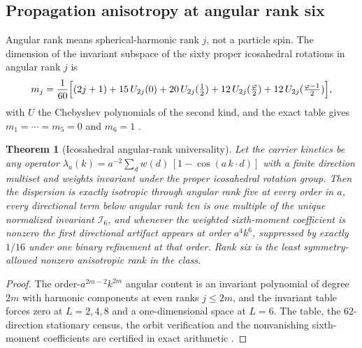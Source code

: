 \documentclass[11pt]{article}
\newtheorem{theorem}{Theorem}[section]
\theoremstyle{definition}
\theoremstyle{remark}
\begin{document}
\subsection{Propagation anisotropy at angular rank six}
\label{sec:spin-six}

Angular rank means spherical-harmonic rank $j$, not a particle spin. The dimension of the invariant subspace of the sixty proper icosahedral rotations in angular rank $j$ is
\[
m_j=\frac1{60}\Bigl[(2j+1)+15\,U_{2j}(0)+20\,U_{2j}(\tfrac12)
+12\,U_{2j}(\tfrac\varphi2)+12\,U_{2j}(\tfrac{\varphi-1}2)\Bigr],
\]
with $U$ the Chebyshev polynomials of the second kind, and the exact table
gives $m_1=\cdots=m_5=0$ and $m_6=1$ \cite{cohan1958}.

\begin{theorem}[Icosahedral angular-rank universality]
\label{thm:spin-six}
Let the carrier kinetics be any operator
$\lambda_a(k)=a^{-2}\sum_d w(d)\,[1-\cos(a\,k\!\cdot\!d)]$ with a finite
direction multiset and weights invariant under the proper icosahedral
rotation group. Then the dispersion is exactly isotropic through angular rank
five at every order in $a$, every directional term below angular rank ten is
one multiple of the unique normalized invariant $\mathcal I_6$, and whenever
the weighted sixth-moment coefficient is nonzero the first directional
artifact appears at order $a^4k^6$, suppressed by exactly $1/16$ under one
binary refinement at that order. Rank six is the least symmetry-allowed
nonzero anisotropic rank in the class.
\end{theorem}

\begin{proof}
The order-$a^{2m-2}k^{2m}$ angular content is an invariant polynomial of
degree $2m$ with harmonic components at even ranks $j\le2m$, and the
invariant table forces zero at $L=2,4,8$ and a one-dimensional space at
$L=6$. The table, the $62$-direction stationary census, the orbit
verification and the nonvanishing sixth-moment coefficients are certified in
exact arithmetic \cite{ophrepo}.
\end{proof}
\end{document}
